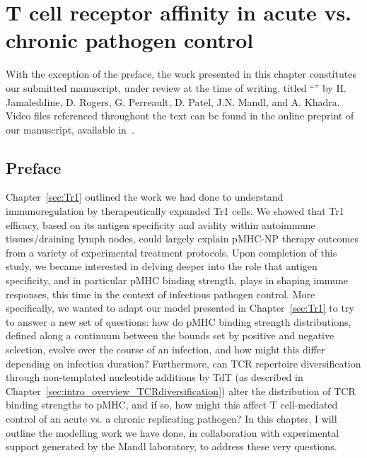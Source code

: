 \chapter{T cell receptor affinity in acute vs. chronic pathogen control}
\label{sec:AvC}

With the exception of the preface, the work presented in this chapter constitutes our submitted manuscript, under review at the time of writing, titled ``'' by H. Jamaleddine, D. Rogers, G. Perreault, D. Patel, J.N. Mandl, and A. Khadra. Video files referenced throughout the text can be found in the online preprint of our manuscript, available in~\cite{jamaleddine2022chronic}.


\section*{Preface}

Chapter~\ref{sec:Tr1} outlined the work we had done to understand immunoregulation by therapeutically expanded Tr1 cells. We showed that Tr1 efficacy, based on its antigen specificity and avidity within autoimmune tissues/draining lymph nodes, could largely explain pMHC-NP therapy outcomes from a variety of experimental treatment protocols. Upon completion of this study, we became interested in delving deeper into the role that antigen specificity, and in particular pMHC binding strength, plays in shaping immune responses, this time in the context of infectious pathogen control. More specifically, we wanted to adapt our model presented in Chapter~\ref{sec:Tr1} to try to answer a new set of questions: how do pMHC binding strength distributions, defined along a continuum between the bounds set by positive and negative selection, evolve over the course of an infection, and how might this differ depending on infection duration? Furthermore, can TCR repertoire diversification through non-templated nucleotide additions by TdT (as described in Chapter~\ref{sec:intro_overview_TCRdiversification}) alter the distribution of TCR binding strengths to pMHC, and if so, how might this affect T cell-mediated control of an acute vs. a chronic replicating pathogen? In this chapter, I will outline the modelling work we have done, in collaboration with experimental support generated by the Mandl laboratory, to address these very questions.

